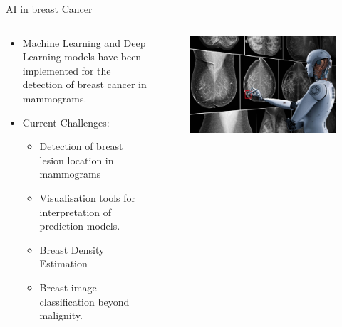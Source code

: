 \begin{frame}{AI in breast Cancer}
    \begin{columns}
        \begin{column}{0.6\textwidth}
            \begin{itemize}
                \item Machine Learning and Deep Learning models have been implemented for the detection of breast cancer in mammograms. 
                \item Current Challenges:
                \begin{itemize}
                    \item Detection of breast lesion location in mammograms 
                    \item Visualisation tools for interpretation of prediction models.
                    \item Breast Density Estimation
                    \item Breast image classification beyond malignity.
                \end{itemize}
            \end{itemize}
        \end{column}
        \begin{column}{0.4\textwidth}
            \begin{figure}
                \centering
                \includegraphics[width=\textwidth]{imagenes/nvidiaAI.jpg}
            \end{figure}
        \end{column}
    \end{columns}
    
\end{frame}

